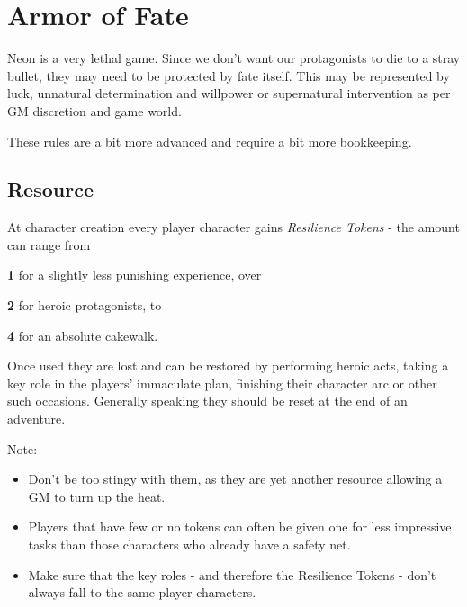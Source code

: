 \documentclass[12pt,a4paper,openany,usenames,dvipsnames]{book}
\begin{document}
	\chapter{Armor of Fate}
	Neon is a very lethal game.
	Since we don't want our protagonists to die to a stray bullet, they may need to be protected by fate itself. 
	This may be represented by luck, unnatural determination and willpower or supernatural intervention as per GM discretion and game world.
	\begin{exampleblock}
		These rules are a bit more advanced and require a bit more bookkeeping.
	\end{exampleblock}
	
	\section{Resource}
	At character creation every player character gains \emph{Resilience Tokens} - the amount can range from
	\begin{sitemize}
		\item \textbf{1} for a slightly less punishing experience, over
		\item \textbf{2} for heroic protagonists, to
		\item \textbf{4} for an absolute cakewalk.
	\end{sitemize}
	Once used they are lost and can be restored by performing heroic acts, taking a key role in the players' immaculate plan, finishing their character arc or other such occasions. Generally speaking they should be reset at the end of an adventure.
	\begin{exampleblock}
		Note:
		\begin{itemize}
			\item Don't be too stingy with them, as they are yet another resource allowing a GM to turn up the heat.
			\item Players that have few or no tokens can often be given one for less impressive tasks than those characters who already have a safety net.
			\item Make sure that the key roles - and therefore the Resilience Tokens - don't always fall to the same player characters.
		\end{itemize}
	\end{exampleblock}
\end{document}
